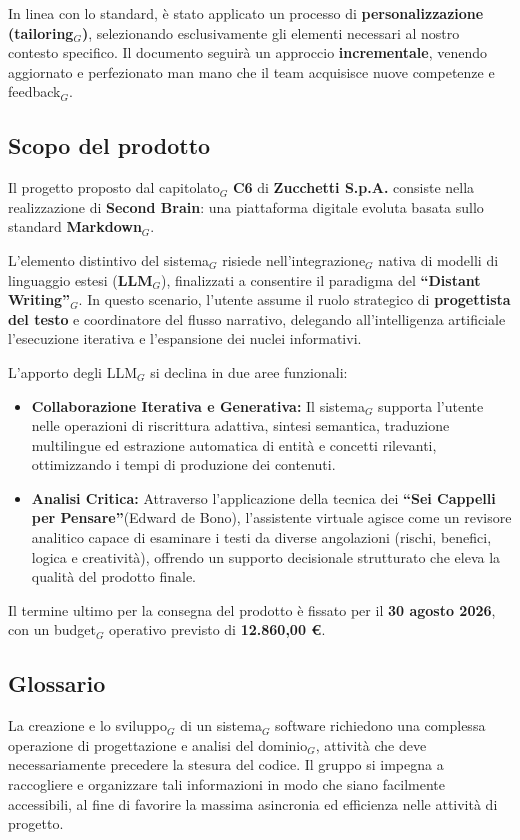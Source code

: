 \documentclass[a4paper, 10pt]{article}
\begin{document}
In linea con lo standard, è stato applicato un processo di \textbf{personalizzazione (tailoring$_G$)}, selezionando esclusivamente gli elementi necessari al nostro contesto specifico. Il documento seguirà un approccio \textbf{incrementale}, venendo aggiornato e perfezionato man mano che il team acquisisce nuove competenze e feedback$_G$.

\subsection{Scopo del prodotto}

Il progetto proposto dal capitolato$_G$ \textbf{C6} di \textbf{Zucchetti S.p.A.} consiste nella realizzazione di \textbf{Second Brain}: una piattaforma digitale evoluta basata sullo standard \textbf{Markdown$_G$}.

L'elemento distintivo del sistema$_G$ risiede nell'integrazione$_G$ nativa di modelli di linguaggio estesi (\textbf{LLM$_G$}), finalizzati a consentire il paradigma del \textbf{``Distant Writing''$_G$}. In questo scenario, l'utente assume il ruolo strategico di \textbf{progettista del testo} e coordinatore del flusso narrativo, delegando all'intelligenza artificiale l'esecuzione iterativa e l'espansione dei nuclei informativi.

L'apporto degli LLM$_G$ si declina in due aree funzionali:

\begin{itemize}
    \item \textbf{Collaborazione Iterativa e Generativa:} Il sistema$_G$ supporta l'utente nelle operazioni di riscrittura adattiva, sintesi semantica, traduzione multilingue ed estrazione automatica di entità e concetti rilevanti, ottimizzando i tempi di produzione dei contenuti.
    \item \textbf{Analisi Critica:} Attraverso l'applicazione della tecnica dei \textbf{``Sei Cappelli per Pensare''}(Edward de Bono), l'assistente virtuale agisce come un revisore analitico capace di esaminare i testi da diverse angolazioni (rischi, benefici, logica e creatività), offrendo un supporto decisionale strutturato che eleva la qualità del prodotto finale.
\end{itemize}

Il termine ultimo per la consegna del prodotto è fissato per il \textbf{30 agosto 2026}, con un budget$_G$ operativo previsto di \textbf{12.860,00 €}.

\subsection{Glossario}
La creazione e lo sviluppo$_G$ di un sistema$_G$ software richiedono una complessa operazione di progettazione e analisi del dominio$_G$, attività che deve necessariamente precedere la stesura del codice. Il gruppo si impegna a raccogliere e organizzare tali informazioni in modo che siano facilmente accessibili, al fine di favorire la massima asincronia ed efficienza nelle attività di progetto.
\end{document}
